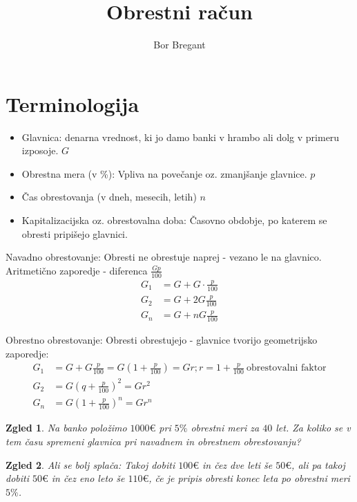 \documentclass{article}
\title{Obrestni račun}
\author{Bor Bregant}
\date{\vspace{-5ex}}
\newtheorem*{zgled}{Zgled}
\begin{document}
\maketitle

\section{Terminologija}

\begin{itemize}
    \item Glavnica: denarna vrednost, ki jo damo banki v hrambo ali dolg v primeru izposoje. $G$
    \item Obrestna mera (v \%): Vpliva na povečanje oz. zmanjšanje glavnice. $p$
    \item Čas obrestovanja (v dneh, mesecih, letih) $n$
    \item Kapitalizacijska oz. obrestovalna doba: Časovno obdobje, po katerem se obresti pripišejo glavnici.
\end{itemize}

Navadno obrestovanje: Obresti ne obrestuje naprej - vezano le na glavnico.\\
Aritmetično zaporedje - diferenca $\frac{Gp}{100}$
\begin{align*} 
G_1 &= G+G\cdot\frac{p}{100}\\
G_2 &= G+2G\frac{p}{100}\\
G_n &=G+nG\frac{p}{100}
\end{align*} 

Obrestno obrestovanje: Obresti obrestujejo - glavnice tvorijo geometrijsko zaporedje:
\begin{align*} 
G_1&=G+G\frac{p}{100}=G(1+\frac{p}{100})=Gr; r=1+\frac{p}{100}\ \text{obrestovalni faktor}\\
G_2&=G(q+\frac{p}{100})^2=Gr^2\\
G_n&=G(1+\frac{p}{100})^n=Gr^n
\end{align*} 

\begin{zgled}
    Na banko položimo $1000\euro{}$ pri $5\%$ obrestni meri za $40$ let. Za koliko se v tem času spremeni glavnica pri navadnem in obrestnem obrestovanju?
\end{zgled}
\begin{zgled}
    Ali se bolj splača: Takoj dobiti $100\euro{}$ in čez dve leti še $50\euro{}$, ali pa takoj dobiti $50\euro{}$ in čez eno leto še $110\euro{}$, če je pripis obresti konec leta po obrestni meri $5\%$.
\end{zgled}
\end{document}
